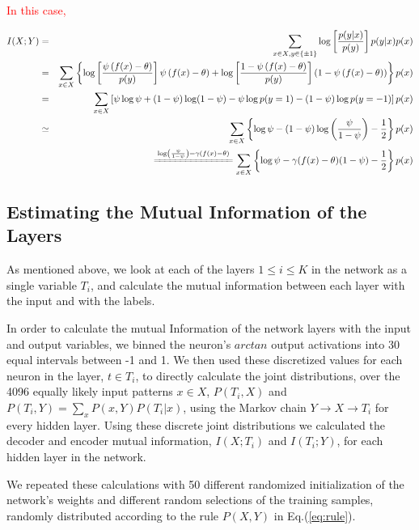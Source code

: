 \documentclass[11pt]{article}
\begin{document}
\textcolor{red}{In this case,}

\begin{eqnarray*}
I(X;Y) & = & \sum_{x \in X, y \in \{\pm 1 \}} \log \left[ \frac{p (y|x)}{ p(y)}\right] p(y|x)p(x) \\
& = & \sum_{x \in X}\left\{ \log \left[ \frac{\psi \left(f(x) - \theta\right)}{ p(y)}\right] \psi \left(f(x) - \theta\right) + \log \left[ \frac{1 - \psi \left(f(x) - \theta\right)}{ p(y)}\right] \left(1 - \psi \left(f(x) - \theta\right)\right) \right\} p(x)\\
&= & \sum_{x \in X}\left[ \psi \log \psi + (1 - \psi )  \log (1 - \psi ) - \psi \log p(y =1 ) - (1 - \psi) \log p(y=-1)  \right] p(x) \\
& \simeq &  \sum_{x \in X}\left\{   \log \psi - (1- \psi) \log \left(\frac{\psi}{1 - \psi }\right)- \frac12\right\} p(x)  \\
&& \xlongequal{\log \left(\frac{\psi}{1 - \psi }\right) = \gamma (f(x) - \theta ) }   \sum_{x \in X}\left\{   \log \psi -  \gamma (f(x) - \theta )(1- \psi) - \frac12\right\} p(x)
\end{eqnarray*}

\subsection{Estimating the Mutual Information of the Layers}

As mentioned above, we look at each of the layers $1\le i\le K$ in the network as a single variable $T_{i}$, and calculate the mutual information between each layer with the input and with the labels. 

In order to calculate the mutual Information of the network layers with the input and output variables, we binned 
the neuron's $arctan$ output activations into 30 equal intervals between -1 and 1. 
We then used these discretized values for each neuron in the layer, $t\in T_i$, to directly calculate the 
joint distributions, over the 4096 equally likely input patterns $x\in X$, $P(T_i,X)$ and 
$P(T_i,Y)=\sum_x P(x,Y)P(T_i|x)$, using the Markov chain $Y\rightarrow X \rightarrow T_i$ for every hidden layer.  
Using these discrete joint distributions we calculated the decoder and encoder mutual information, $I(X;T_i)$ and $I(T_i;Y)$, for each hidden layer in the network.  

We repeated these calculations with 50 different randomized initialization of the network's weights and different random selections of the training samples, randomly distributed according to the rule $P(X,Y)$ in Eq.(\ref{eq:rule}). 
\end{document}
